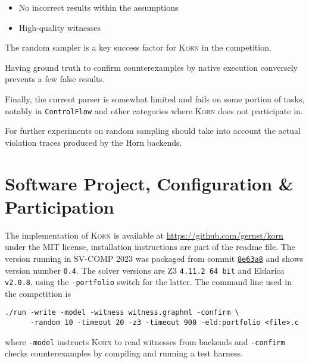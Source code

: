 \documentclass{llncs}
\newcommand{\Korn}{\textsc{Korn}\xspace}
\begin{document}
\begin{itemize}
\item No incorrect results within the assumptions
\item High-quality witnesses
\end{itemize}


The random sampler is a key success factor for \Korn in the competition.

Having ground truth to confirm counterexamples by native execution conversely prevents a few false results.
% 

Finally, the current parser is somewhat limited and fails on some portion of tasks,
notably in \texttt{ControlFlow} and other categories where \Korn does not participate in.


For further experiments on random sampling should
take into account the actual violation traces produced by the Horn backends.

\section{Software Project, Configuration \& Participation}
\label{sec:project}

The implementation of \Korn is available at
    \url{https://github.com/gernst/korn} under the MIT license,
installation instructions are part of the readme file.
The version running in SV-COMP 2023 was packaged from commit
\href{https://github.com/gernst/korn/commit/8e968dd9e1498d358270d1e78d473befca8e63a8}{\tt 8e63a8}
and shows version number \texttt{0.4}.
The solver versions are Z3 \texttt{4.11.2 64 bit} and Eldarica \texttt{v2.0.8}, using the \texttt{-portfolio} switch for the latter.
The command line used in the competition is
\begin{verbatim}
./run -write -model -witness witness.graphml -confirm \
      -random 10 -timeout 20 -z3 -timeout 900 -eld:portfolio <file>.c
\end{verbatim}
where \texttt{-model} instructs \Korn to read witnesses from backends
and \texttt{-confirm} checks counterexamples
by compiling and running a test harness.
\end{document}
